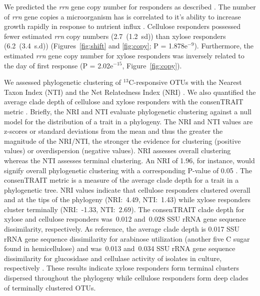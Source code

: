 We predicted the \textit{rrn} gene copy number for responders as described
\citep{Kembel_2012}. The number of \textit{rrn} gene copies
a microorganism has is correlated to it's ability to increase growth
rapidly in response to nutrient influx \citep{Klappenbach_2000}. Cellulose
responders possessed fewer estimated \textit{rrn} copy numbers (2.7~(1.2~sd))
than xylose responders (6.2~(3.4~s.d)) (Figures~\ref{fig:shift} and
\ref{fig:copy}; P = 1.878e$^{-9}$). Furthermore, the estimated \textit{rrn}
gene copy number for xylose responders was inversely related to the day of
first response (P = 2.02e$^{-15}$, Figure~\ref{fig:copy}).

We assessed phylogenetic clustering of $^{13}$C-responsive OTUs with the
Nearest Taxon Index (NTI) and the Net Relatedness Index (NRI)
\citep{Webb2000}. We also quantified the average clade depth of cellulose and
xylose responders with the consenTRAIT metric \citep{Martiny2013}. Briefly, the
NRI and NTI evaluate phylogenetic clustering against a null model for the
distribution of a trait in a phylogeny. The NRI and NTI values are z-scores or
standard deviations from the mean and thus the greater the magnitude of the
NRI/NTI, the stronger the evidence for clustering (positive values) or
overdispersion (negative values). NRI assesses overall clustering whereas the
NTI assesses terminal clustering. An NRI of 1.96, for instance, would signify
overall phylogenetic clustering with a corresponding P-value of 0.05
\citep{Evans2014a}. The consenTRAIT metric is a measure of the average clade
depth for a trait in a phylogenetic tree. NRI values indicate that cellulose
responders clustered overall and at the tips of the phylogeny (NRI:~4.49,
NTI:~1.43) while xylose responders cluster terminally (NRI:~-1.33, NTI:~2.69).
The consenTRAIT clade depth for xylose and cellulose responders was~0.012
and~0.028 SSU rRNA gene sequence dissimilarity, respectively. As reference, the
average clade depth is 0.017 SSU rRNA gene sequence dissimilarity for arabinose
utilization (another five C sugar found in hemicellulose) and was~0.013
and~0.034 SSU rRNA gene sequence dissimilarity for glucosidase and cellulase
activity of isolates in culture, respectively
\citep{Martiny2013,Berlemont2013}. These results indicate xylose responders
form terminal clusters dispersed throughout the phylogeny while cellulose
responders form deep clades of terminally clustered OTUs.
